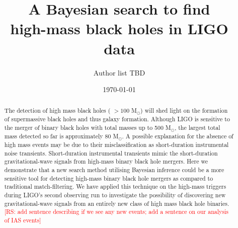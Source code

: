 \documentclass[%
preprint,
 amsmath,amssymb,
 aps,
]{revtex4}
\newcommand{\msun}{{\sc M${}_\odot$}\xspace}
\newcommand{\rs}[1]{\textcolor{red}{[RS: #1]}}
\begin{document}
\preprint{\textcolor[rgb]{0.00,0.50,0.75}{{}}}

\title{A Bayesian search to find \\high-mass black holes in LIGO data}%


\author{Author list TBD}

\date{\today}

\begin{abstract}

The detection of high mass black holes ( $>100$ \msun) will shed light on the formation of supermassive black holes and thus galaxy formation. Although LIGO is sensitive to the merger of binary black holes with total masses up to 500 \msun, the largest total mass detected so far is approximately $80$ \msun. A possible explanation for the absence of high mass events may be due to their misclassification as short-duration instrumental noise transients. Short-duration instrumental transients mimic the short-duration gravitational-wave signals from high-mass binary black hole mergers. Here we demonstrate that a new search method utilising Bayesian inference could be a more sensitive tool for detecting high-mass binary black hole mergers as compared to traditional match-filtering. We have applied this technique on the high-mass triggers during LIGO's second observing run to investigate the possibility of discovering new gravitational-wave signals from an entirely new class of high mass black hole binaries. \rs{add sentence describing if we see any new events; add a sentence on our analysis of IAS events}



\end{abstract}

\maketitle



\end{document}
